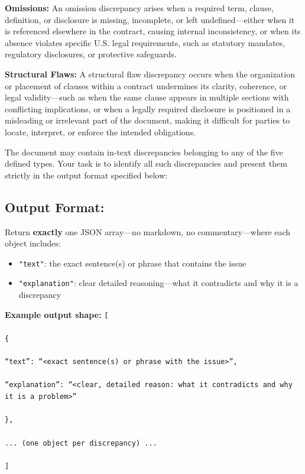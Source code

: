 \begin{tcolorbox}[breakable,colback=lightestgray,colframe=black,title=\textbf{Eval\_3 L1: In-Text Discrepancy Detection Prompt}]
\textbf{Omissions:}
An omission discrepancy arises when a required term, clause, definition, or disclosure is missing, incomplete, or left undefined—either when it is referenced elsewhere in the contract, causing internal inconsistency, or when its absence violates specific U.S. legal requirements, such as statutory mandates, regulatory disclosures, or protective safeguards.

\textbf{Structural Flaws:}
A structural flaw discrepancy occurs when the organization or placement of clauses within a contract undermines its clarity, coherence, or legal validity—such as when the same clause appears in multiple sections with conflicting implications, or when a legally required disclosure is positioned in a misleading or irrelevant part of the document, making it difficult for parties to locate, interpret, or enforce the intended obligations.

The document may contain in-text discrepancies belonging to any of the five defined types. Your task is to identify all such discrepancies and present them strictly in the output format specified below:

\subsection*{\textbf{Output Format:}}
Return \textbf{exactly} one JSON array—no markdown, no commentary—where each object includes:
\begin{itemize}
    \item \texttt{"text"}: the exact sentence(s) or phrase that contains the issue
    \item \texttt{"explanation"}: clear detailed reasoning—what it contradicts and why it is a discrepancy
\end{itemize}

\textbf{Example output shape:}
{\small
\texttt{[\\\\
\{\\\\
``text'': ``<exact sentence(s) or phrase with the issue>'',\\\\
``explanation'': ``<clear, detailed reason: what it contradicts and why it is a problem>''\\\\
\},\\\\
... (one object per discrepancy) ...\\\\
]}
}


\end{tcolorbox}
